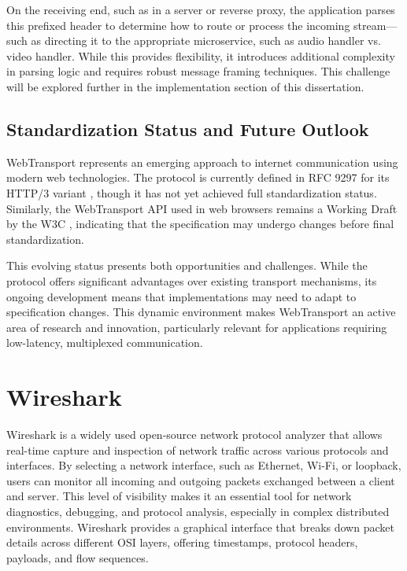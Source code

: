 On the receiving end, such as in a server or reverse proxy, the application parses this prefixed header to determine how to route or process the incoming stream—such as directing it to the appropriate microservice, such as audio handler vs. video handler. While this provides flexibility, it introduces additional complexity in parsing logic and requires robust message framing techniques. This challenge will be explored further in the implementation section of this dissertation.

\subsection{Standardization Status and Future Outlook}

WebTransport represents an emerging approach to internet communication using modern web technologies. The protocol is currently defined in RFC 9297 for its HTTP/3 variant \cite{webtransport-draft}, though it has not yet achieved full standardization status. Similarly, the WebTransport API used in web browsers remains a Working Draft by the W3C \cite{webtransport-w3c}, indicating that the specification may undergo changes before final standardization.

This evolving status presents both opportunities and challenges. While the protocol offers significant advantages over existing transport mechanisms, its ongoing development means that implementations may need to adapt to specification changes. This dynamic environment makes WebTransport an active area of research and innovation, particularly relevant for applications requiring low-latency, multiplexed communication.


\section{Wireshark}

Wireshark is a widely used open-source network protocol analyzer that allows real-time capture and inspection of network traffic across various protocols and interfaces. By selecting a network interface, such as Ethernet, Wi-Fi, or loopback, users can monitor all incoming and outgoing packets exchanged between a client and server. This level of visibility makes it an essential tool for network diagnostics, debugging, and protocol analysis, especially in complex distributed environments. Wireshark provides a graphical interface that breaks down packet details across different OSI layers, offering timestamps, protocol headers, payloads, and flow sequences.


